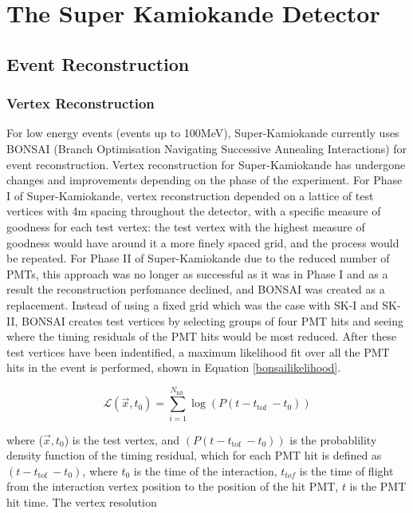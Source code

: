 \chapter{The Super Kamiokande Detector}
\label{chp:superk}


\section{Event Reconstruction}

\subsection{Vertex Reconstruction}
For low energy events (events up to 100MeV), Super-Kamiokande currently uses BONSAI (Branch Optimisation Navigating Successive Annealing Interactions) for event reconstruction. Vertex reconstruction for Super-Kamiokande has undergone changes and improvements depending on the phase of the experiment. 
\newline{}
For Phase I of Super-Kamiokande, vertex reconstruction depended on a lattice of test vertices with 4m spacing throughout the detector, with a specific measure of goodness for each test vertex: the test vertex with the highest measure of goodness would have around it a more finely spaced grid, and the process would be repeated. For Phase II of Super-Kamiokande due to the reduced number of PMTs, this approach was no longer as successful as it was in Phase I and as a result the reconstruction perfomance declined, and BONSAI was created as a replacement. Instead of using a fixed grid which was the case with SK-I and SK-II, BONSAI creates test vertices by selecting groups of four PMT hits and seeing where the timing residuals of the PMT hits would be most reduced. After these test vertices have been indentified, a maximum likelihood fit over all the PMT hits in the event is performed, shown in Equation \ref{bonsailikelihood}.

\begin{equation}
    \mathcal{L}(\vec{x}, t_{0})=\sum_{i=1}^{N_{\text {hlt }}} \log (P(t-t_{\text {tof }}-t_{0}))
\label{bonsailikelihood}
\end{equation}

where ($\vec{x}, t_{0}$) is the test vertex, and $(P(t-t_{\text {tof }}-t_{0}))$ is the probablility density function of the timing residual, which for each PMT hit is defined as $(t-t_{\text {tof }}-t_{0})$, where $t_{0}$ is the time of the interaction, $t_{tof}$ is the time of flight from the interaction vertex position to the position of the hit PMT, $t$ is the PMT hit time. The vertex resolution 


